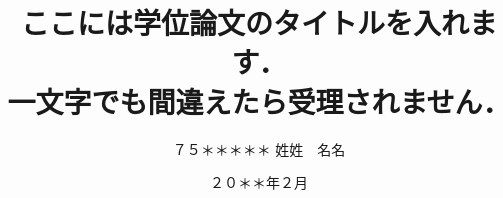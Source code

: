 \documentclass[
    paper=a4paper,      %
    report,             %
    fleqn,              %
    fontsize=12pt,      %
    jafontsize=12pt,    %
    head_space=33mm,    %
    foot_space=30mm,    %
    gutter=25mm,        %
    fore-edge=10mm      %
    ]{jlreq}            %
\begin{document}


\title{ここには学位論文のタイトルを入れます．\\ 一文字でも間違えたら受理されません．}

\date{２０＊＊年２月}




\author{%
７５＊＊＊＊＊
\zw%
姓姓　名名
} %

\makecover

\tableofcontents



\clearpage
\pagestyle{normal}
\setcounter{page}{0}














\biblist





\end{document}
